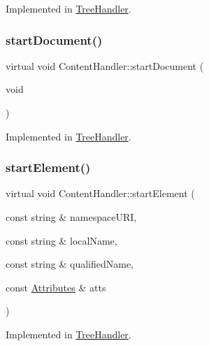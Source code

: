 Implemented in \mbox{\hyperlink{class_tree_handler_a4255e1d0d2663ac73b752ee1c82de371}{Tree\+Handler}}.

\mbox{\label{class_content_handler_a7f68f6c0e6f33654c3be999a8da17138}} 
\subsubsection{\texorpdfstring{startDocument()}{startDocument()}}
{\footnotesize\ttfamily virtual void Content\+Handler\+::start\+Document (\begin{DoxyParamCaption}\item[{void}]{ }\end{DoxyParamCaption})\hspace{0.3cm}{\ttfamily [pure virtual]}}



Implemented in \mbox{\hyperlink{class_tree_handler_a07e8d7c372805a366c14683f4d4a0cb3}{Tree\+Handler}}.

\mbox{\label{class_content_handler_a77a58836917fd32b56230151f6d6966e}} 
\subsubsection{\texorpdfstring{startElement()}{startElement()}}
{\footnotesize\ttfamily virtual void Content\+Handler\+::start\+Element (\begin{DoxyParamCaption}\item[{const string \&}]{namespace\+U\+RI,  }\item[{const string \&}]{local\+Name,  }\item[{const string \&}]{qualified\+Name,  }\item[{const \mbox{\hyperlink{class_attributes}{Attributes}} \&}]{atts }\end{DoxyParamCaption})\hspace{0.3cm}{\ttfamily [pure virtual]}}



Implemented in \mbox{\hyperlink{class_tree_handler_a6bd0480fcc5176e1ec06148aa7d2bff3}{Tree\+Handler}}.

\mbox{\label{class_content_handler_ac6e945ce50f644015db0d3045465c2ca}} 
